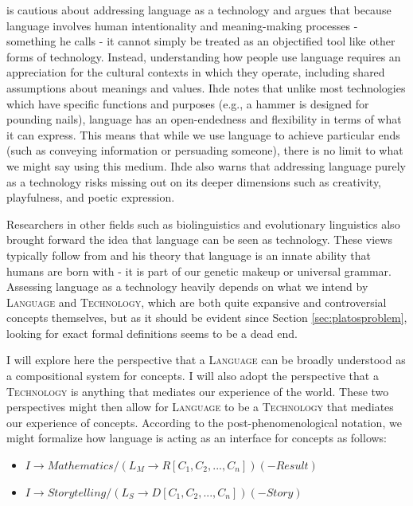 \cite{Ihde1993} is cautious about addressing language as a technology and argues that because language involves human intentionality and meaning-making processes - something he calls  - it cannot simply be treated as an objectified tool like other forms of technology. Instead, understanding how people use language requires an appreciation for the cultural contexts in which they operate, including shared assumptions about meanings and values. Ihde notes that unlike most technologies which have specific functions and purposes (e.g., a hammer is designed for pounding nails), language has an open-endedness and flexibility in terms of what it can express. This means that while we use language to achieve particular ends (such as conveying information or persuading someone), there is no limit to what we might say using this medium. Ihde also warns that addressing language purely as a technology risks missing out on its deeper dimensions such as creativity, playfulness, and poetic expression.

Researchers in other fields such as biolinguistics \citep{Koster2009} and evolutionary linguistics \citep{Mufwene2013} also brought forward the idea that language can be seen as technology. These views typically follow from \cite{Chomsky1957} and his theory that language is an innate ability that humans are born with - it is part of our genetic makeup or universal grammar. Assessing language as a technology heavily depends on what we intend by \textsc{Language} and \textsc{Technology}, which are both quite expansive and controversial concepts themselves, but as it should be evident since Section \ref{sec:platosproblem}, looking for exact formal definitions seems to be a dead end.

I will explore here the perspective that a \textsc{Language} can be broadly understood as a compositional system for concepts. I will also adopt the perspective that a \textsc{Technology} is anything that mediates our experience of the world. These two perspectives might then allow for \textsc{Language} to be a \textsc{Technology} that mediates our experience of concepts. According to the post-phenomenological notation, we might formalize how language is acting as an interface for concepts as follows:

\begin{itemize}
	\singlespacing
	\item $ I \rightarrow Mathematics / (L_M \rightarrow R[C_1,C_2, ..., C_n]) (- Result) $
	\item  $ I \rightarrow Storytelling / (L_S \rightarrow D[C_1,C_2,...,C_n]) (- Story) $
\end{itemize}

